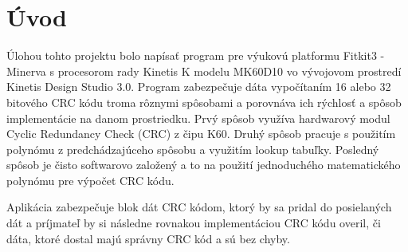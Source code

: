 \documentclass[../projekt.tex]{subfiles}
\begin{document}

\chapter{Úvod}\label{uvod}

Úlohou tohto projektu bolo napísať program pre výukovú platformu Fitkit3 - Minerva s procesorom rady Kinetis K modelu MK60D10 vo vývojovom prostredí Kinetis Design Studio 3.0. Program zabezpečuje dáta vypočítaním 16 alebo 32 bitového CRC kódu troma rôznymi spôsobami a porovnáva ich rýchlosť a spôsob implementácie na danom prostriedku. Prvý spôsob využíva hardwarový modul Cyclic Redundancy Check (CRC) z čipu K60. Druhý spôsob pracuje s použitím polynómu z predchádzajúceho spôsobu a využitím lookup tabuľky. Posledný spôsob je čisto softwarovo založený a to na použití jednoduchého matematického polynómu pre výpočet CRC kódu. 

Aplikácia zabezpečuje blok dát CRC kódom, ktorý by sa pridal do posielaných dát a príjmateľ by si následne rovnakou implementáciou CRC kódu overil, či dáta, ktoré dostal majú správny CRC kód a sú bez chyby. 
\end{document}
